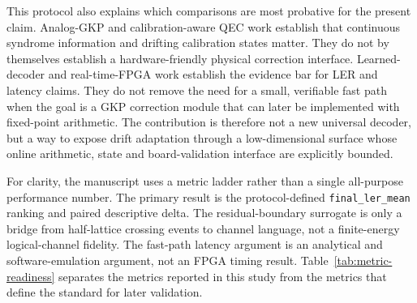 \documentclass[11pt]{article}
\newcommand{\finalLER}{\texttt{final\_ler\_mean}}
\begin{document}
This protocol also explains which comparisons are most probative for the
present claim.  Analog-GKP and calibration-aware QEC work establish that
continuous syndrome information and drifting calibration states matter.  They
do not by themselves establish a hardware-friendly physical correction
interface.  Learned-decoder and real-time-FPGA work establish the evidence bar
for LER and latency claims.  They do not remove the need for a small,
verifiable fast path when the goal is a GKP correction module that can later be
implemented with fixed-point arithmetic.  The contribution is therefore not a
new universal decoder, but a way to expose drift adaptation through a
low-dimensional surface whose online arithmetic, state and board-validation
interface are explicitly bounded.

For clarity, the manuscript uses a metric ladder rather than a single
all-purpose performance number.  The primary result is the protocol-defined
\finalLER{} ranking and paired descriptive delta.  The residual-boundary
surrogate is only a bridge from half-lattice crossing events to channel
language, not a finite-energy logical-channel fidelity.  The fast-path latency
argument is an analytical and software-emulation argument, not an FPGA timing
result.  Table~\ref{tab:metric-readiness} separates the metrics
reported in this study from the metrics that define the standard for later
validation.
\end{document}
